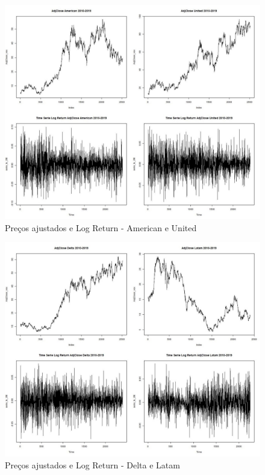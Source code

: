 \documentclass[12pt]{article}
\begin{document}
\begin{figure}[H]
	\centering
	\includegraphics[width=0.8\linewidth]{../Modelos/SeriesCompUSA10_19}
	\caption{Preços ajustados e Log Return - American e United}
	\label{fig:seriescompusa1019}
\end{figure}

\begin{figure}[H]
	\centering
	\includegraphics[width=0.8\linewidth]{../Modelos/SeriesCompDeltaLat10_19}
	\caption{Preços ajustados e Log Return - Delta e Latam}
	\label{fig:seriescompdeltalat1019}
\end{figure}
\end{document}
